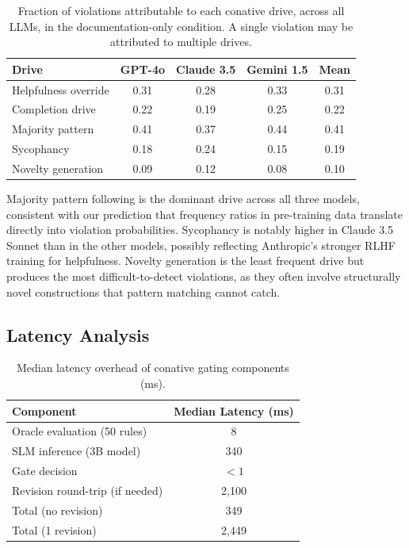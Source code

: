 \documentclass[11pt,a4paper]{article}
\begin{document}
\begin{table}[t]
\centering
\caption{Fraction of violations attributable to each conative drive,
across all LLMs, in the documentation-only condition.  A single
violation may be attributed to multiple drives.}
\label{tab:drive-attribution}
\begin{tabular}{@{}lcccc@{}}
\toprule
\textbf{Drive} & \textbf{GPT-4o} & \textbf{Claude 3.5} & \textbf{Gemini 1.5} & \textbf{Mean} \\
\midrule
Helpfulness override    & 0.31 & 0.28 & 0.33 & 0.31 \\
Completion drive        & 0.22 & 0.19 & 0.25 & 0.22 \\
Majority pattern        & 0.41 & 0.37 & 0.44 & 0.41 \\
Sycophancy              & 0.18 & 0.24 & 0.15 & 0.19 \\
Novelty generation      & 0.09 & 0.12 & 0.08 & 0.10 \\
\bottomrule
\end{tabular}
\end{table}

Majority pattern following is the dominant drive across all three
models, consistent with our prediction that frequency ratios in
pre-training data translate directly into violation probabilities.
Sycophancy is notably higher in Claude 3.5 Sonnet than in the
other models, possibly reflecting Anthropic's stronger RLHF
training for helpfulness.  Novelty generation is the least frequent
drive but produces the most difficult-to-detect violations, as
they often involve structurally novel constructions that pattern
matching cannot catch.

\subsection{Latency Analysis}

\begin{table}[h]
\centering
\caption{Median latency overhead of conative gating components (ms).}
\label{tab:latency}
\begin{tabular}{@{}lc@{}}
\toprule
\textbf{Component} & \textbf{Median Latency (ms)} \\
\midrule
Oracle evaluation (50 rules) & 8 \\
SLM inference (3B model) & 340 \\
Gate decision & $< 1$ \\
Revision round-trip (if needed) & 2,100 \\
\midrule
Total (no revision) & 349 \\
Total (1 revision) & 2,449 \\
\bottomrule
\end{tabular}
\end{table}
\end{document}

